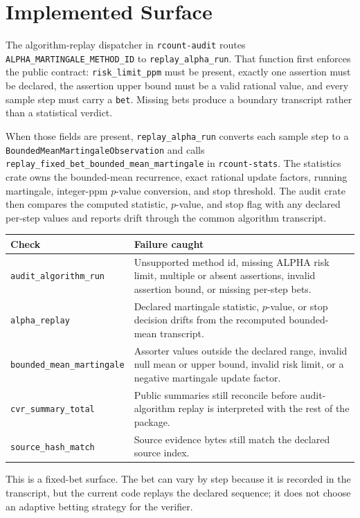 \section{Implemented Surface}

The algorithm-replay dispatcher in \texttt{rcount-audit} routes
\texttt{ALPHA\_MARTINGALE\_METHOD\_ID} to \texttt{replay\_alpha\_run}. That
function first enforces the public contract: \texttt{risk\_limit\_ppm} must be
present, exactly one assertion must be declared, the assertion upper bound must
be a valid rational value, and every sample step must carry a \texttt{bet}.
Missing bets produce a boundary transcript rather than a statistical verdict.

When those fields are present, \texttt{replay\_alpha\_run} converts each sample
step to a \texttt{BoundedMeanMartingaleObservation} and calls
\texttt{replay\_fixed\_bet\_bounded\_mean\_martingale} in \texttt{rcount-stats}.
The statistics crate owns the bounded-mean recurrence, exact rational update
factors, running martingale, integer-ppm $p$-value conversion, and stop
threshold. The audit crate then compares the computed statistic, $p$-value, and
stop flag with any declared per-step values and reports drift through the common
algorithm transcript.

\begin{center}
\small
\begin{tabularx}{\textwidth}{lX}
\toprule
Check & Failure caught \\
\midrule
\texttt{audit\_algorithm\_run} & Unsupported method id, missing ALPHA risk limit, multiple or absent assertions, invalid assertion bound, or missing per-step bets. \\
\texttt{alpha\_replay} & Declared martingale statistic, $p$-value, or stop decision drifts from the recomputed bounded-mean transcript. \\
\texttt{bounded\_mean\_martingale} & Assorter values outside the declared range, invalid null mean or upper bound, invalid risk limit, or a negative martingale update factor. \\
\texttt{cvr\_summary\_total} & Public summaries still reconcile before audit-algorithm replay is interpreted with the rest of the package. \\
\texttt{source\_hash\_match} & Source evidence bytes still match the declared source index. \\
\bottomrule
\end{tabularx}
\end{center}

This is a fixed-bet surface. The bet can vary by step because it is recorded in
the transcript, but the current code replays the declared sequence; it does not
choose an adaptive betting strategy for the verifier.
